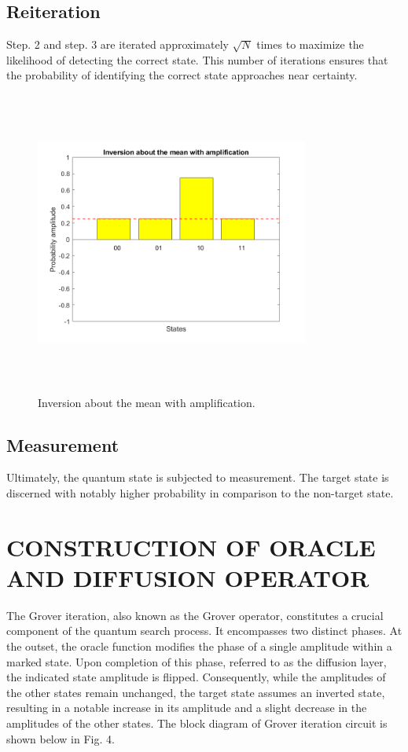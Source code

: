 \documentclass[conference]{IEEEtran}
\begin{document}
\subsection{Reiteration}
Step. 2 and step. 3 are iterated approximately $ \sqrt{N} $ times
to maximize the likelihood of detecting the correct state. This
number of iterations ensures that the probability of identifying
the correct state approaches near certainty.

\begin{figure}[htbp]
	\centerline{\includegraphics[width=9cm,height=10cm,keepaspectratio]{fig3.png}}
	\caption{Inversion about the mean with amplification.}
	\label{fig}
\end{figure}

\subsection{ Measurement}
Ultimately, the quantum state is subjected to measurement.
The target state is discerned with notably higher probability in comparison to the non-target state.

\section{ CONSTRUCTION OF ORACLE AND DIFFUSION
  OPERATOR}
The Grover iteration, also known as the Grover operator,
constitutes a crucial component of the quantum search process.
It encompasses two distinct phases. At the outset, the oracle
function modifies the phase of a single amplitude within a
marked state. Upon completion of this phase, referred to as
the diffusion layer, the indicated state amplitude is flipped.
Consequently, while the amplitudes of the other states remain
unchanged, the target state assumes an inverted state, resulting
in a notable increase in its amplitude and a slight decrease in
the amplitudes of the other states. The block diagram of Grover
iteration circuit is shown below in Fig. 4.
\end{document}
